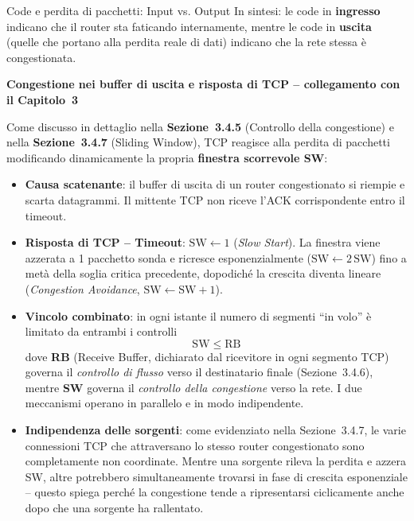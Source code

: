 \documentclass[a4paper,12pt]{report}
\begin{document}
\begin{notebox}{Code e perdita di pacchetti: Input vs. Output}
\vspace{0.1cm}
In sintesi: le code in \textbf{ingresso} indicano che il router sta faticando internamente, mentre le code in \textbf{uscita} (quelle che portano alla perdita reale di dati) indicano che la rete stessa è congestionata.
\end{notebox}

\begin{collegamentobox}
\textbf{Congestione nei buffer di uscita e risposta di TCP
-- collegamento con il Capitolo~3}
\vspace{1cm}

Come discusso in dettaglio nella
\textbf{Sezione~3.4.5} (Controllo della congestione) e nella
\textbf{Sezione~3.4.7} (Sliding Window), TCP reagisce alla perdita di
pacchetti modificando dinamicamente la propria \textbf{finestra
scorrevole SW}:

\begin{itemize}
    \item \textbf{Causa scatenante}: il buffer di uscita di un router
          congestionato si riempie e scarta datagrammi. Il mittente TCP
          non riceve l'ACK corrispondente entro il timeout.

    \item \textbf{Risposta di TCP -- Timeout}:
          $\text{SW} \leftarrow 1$ (\textit{Slow Start}).
          La finestra viene azzerata a 1 pacchetto sonda e ricresce
          esponenzialmente ($\text{SW} \leftarrow 2\,\text{SW}$) fino
          a metà della soglia critica precedente, dopodiché la crescita
          diventa lineare (\textit{Congestion Avoidance},
          $\text{SW} \leftarrow \text{SW} + 1$).

    \item \textbf{Vincolo combinato}: in ogni istante il numero di
          segmenti ``in volo'' è limitato da entrambi i controlli
          \[
              \text{SW} \;\leq\; \text{RB}
          \]
          dove \textbf{RB} (Receive Buffer, dichiarato dal ricevitore
          in ogni segmento TCP) governa il \textit{controllo di flusso}
          verso il destinatario finale (Sezione~3.4.6), mentre
          \textbf{SW} governa il \textit{controllo della congestione}
          verso la rete. I due meccanismi operano in parallelo e in
          modo indipendente.

    \item \textbf{Indipendenza delle sorgenti}: come evidenziato nella
          Sezione~3.4.7, le varie connessioni TCP che attraversano lo
          stesso router congestionato sono completamente non coordinate.
          Mentre una sorgente rileva la perdita e azzera SW, altre
          potrebbero simultaneamente trovarsi in fase di crescita
          esponenziale -- questo spiega perché la congestione tende a
          ripresentarsi ciclicamente anche dopo che una sorgente ha
          rallentato.
\end{itemize}

\end{collegamentobox}
\end{document}
